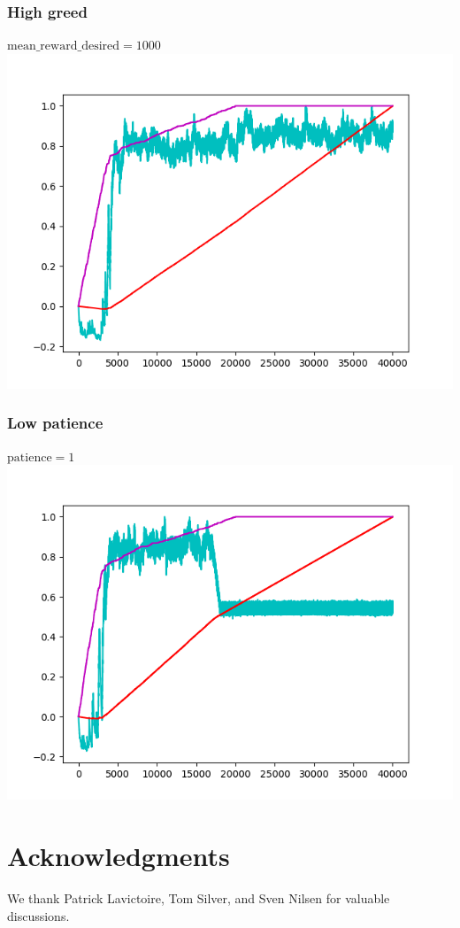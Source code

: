 \documentclass{article}
\begin{document}
\subsubsection{High greed}
$\mathrm{mean\_reward\_desired} = 1000$\\
\includegraphics{borgies_greed10000000.png}

\subsubsection{Low patience}
$\mathrm{patience} = 1$\\
\includegraphics{borgies_patience10000.png}

\section{Acknowledgments}

We thank Patrick Lavictoire, Tom Silver, and Sven Nilsen for valuable
discussions.

 

\end{document}
